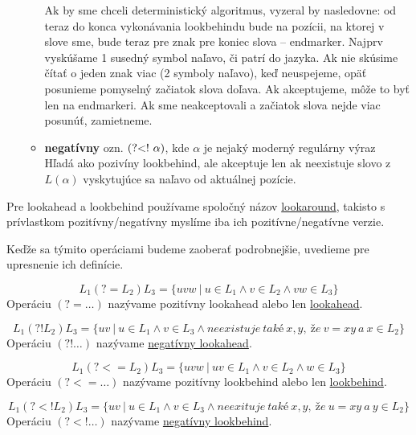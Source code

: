 \begin{itemize}
\begin{itemize}
Ak by sme chceli deterministický algoritmus, vyzeral by nasledovne: od teraz do konca vykonávania lookbehindu bude na pozícii, na ktorej v slove sme, bude teraz pre znak pre koniec slova -- endmarker. Najprv vyskúšame 1 susedný symbol naľavo, či patrí do jazyka. Ak nie skúsime čítať o jeden znak viac (2 symboly naľavo), keď neuspejeme, opäť posunieme pomyselný začiatok slova doľava. Ak akceptujeme, môže to byť len na endmarkeri. Ak sme neakceptovali a začiatok slova nejde viac posunúť, zamietneme.
\item \textbf{negatívny} ozn. $\text{(?\textless !~}\alpha)$, kde $\alpha$ je nejaký moderný regulárny výraz \\ Hľadá ako pozivíny lookbehind, ale akceptuje len ak neexistuje slovo z $L(\alpha)$ vyskytujúce sa naľavo od aktuálnej pozície.
\end{itemize}
\end{itemize}

Pre lookahead a lookbehind používame spoločný názov \underline{lookaround}, takisto s prívlastkom pozitívny/negatívny myslíme iba ich pozitívne/negatívne verzie.

Keďže sa týmito operáciami budeme zaoberať podrobnejšie, uvedieme pre upresnenie ich definície.

\begin{df}
$$ L_{1}(?=L_{2})L_{3} = \lbrace uvw ~|~ u \in L_{1} \land v \in L_{2} \land vw \in L_{3} \rbrace $$ Operáciu $(?=\dots)$ nazývame pozitívny lookahead alebo len \underline{lookahead}.
\end{df}

\begin{df}
$$ L_{1}(?!L_{2})L_{3} = \lbrace uv ~|~ u \in L_{1} \land v \in L_{3} \land neexistuje~také~x,y,~že~v=xy~a~x \in L_2 \rbrace $$ Operáciu $(?!\dots)$ nazývame \underline{negatívny lookahead}.
\end{df}

\begin{df}
$$ L_{1}(?<=L_{2})L_{3} = \lbrace uvw ~|~ uv \in L_{1} \land v \in L_{2} \land w \in L_{3} \rbrace $$ Operáciu $(?<=\dots)$ nazývame pozitívny lookbehind alebo len \underline{lookbehind}.
\end{df}

\begin{df}
$$ L_{1}(?<!L_{2})L_{3} = \lbrace uv ~|~ u \in L_{1} \land v \in L_{3} \land neexituje~také~x,y,~že~u=xy~a~y \in L_2 \rbrace $$ Operáciu $(?<!\dots)$ nazývame \underline{negatívny lookbehind}.
\end{df}

